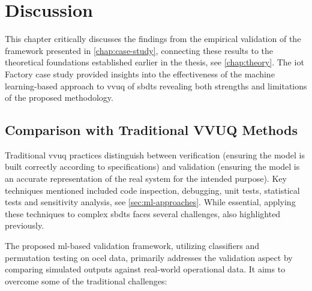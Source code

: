 \chapter{Discussion}
\label{chap:discussion}

This chapter critically discusses the findings from the empirical validation of the framework presented in \autoref{chap:case-study}, connecting these results to the theoretical foundations established earlier in the thesis, see \autoref{chap:theory}. The \gls{iot} Factory case study provided insights into the effectiveness of the machine learning-based approach to \gls{vvuq} of \gls{sbdt}s revealing both strengths and limitations of the proposed methodology.

\section{Comparison with Traditional VVUQ Methods}
\label{sec:comparison_manual}

Traditional \gls{vvuq} practices distinguish between verification (ensuring the model is built correctly according to specifications) and validation (ensuring the model is an accurate representation of the real system for the intended purpose). Key techniques mentioned included code inspection, debugging, unit tests, statistical tests and sensitivity analysis, see \autoref{sec:ml-approaches}. While essential, applying these techniques to complex \gls{sbdt}s faces several challenges, also highlighted previously.

The proposed \gls{ml}-based validation framework, utilizing classifiers and permutation testing on \gls{ocel} data, primarily addresses the validation aspect by comparing simulated outputs against real-world operational data. It aims to overcome some of the traditional challenges:

